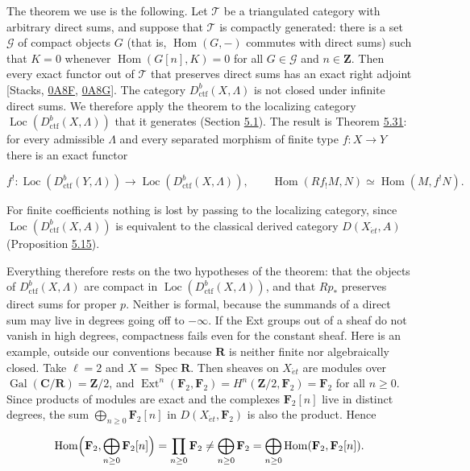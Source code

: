 \documentclass[11pt]{article}
\providecommand{\Ext}{}\renewcommand{\Ext}{\operatorname{Ext}}
\providecommand{\Hom}{}\renewcommand{\Hom}{\operatorname{Hom}}
\providecommand{\Loc}{}\renewcommand{\Loc}{\operatorname{Loc}}
\begin{document}
The theorem we use is the following. Let \(\mathcal T\) be a triangulated category with arbitrary direct sums, and suppose that \(\mathcal T\) is compactly generated: there is a set \(\mathcal G\) of compact objects \(G\) (that is, \(\Hom(G,-)\) commutes with direct sums) such that \(K=0\) whenever \(\Hom(G[n],K)=0\) for all \(G\in\mathcal G\) and \(n\in\mathbf Z\). Then every exact functor out of \(\mathcal T\) that preserves direct sums has an exact right adjoint [Stacks, \href{https://stacks.math.columbia.edu/tag/0A8F}{0A8F}, \href{https://stacks.math.columbia.edu/tag/0A8G}{0A8G}]. The category \(D^b_{\mathrm{ctf}}(X,\Lambda)\) is not closed under infinite direct sums. We therefore apply the theorem to the localizing category \(\Loc(D^b_{\mathrm{ctf}}(X,\Lambda))\) that it generates (Section \hyperref[bp409]{5.1}). The result is Theorem \hyperref[bp506]{5.31}: for every admissible \(\Lambda\) and every separated morphism of finite type \(f:X\to Y\) there is an exact functor

\[
f^!:\Loc(D^b_{\mathrm{ctf}}(Y,\Lambda))\to\Loc(D^b_{\mathrm{ctf}}(X,\Lambda)),
\qquad
\Hom(Rf_!M,N)\simeq\Hom(M,f^!N).
\]

For finite coefficients nothing is lost by passing to the localizing category, since \(\Loc(D^b_{\mathrm{ctf}}(X,A))\) is equivalent to the classical derived category \(D(X_{\acute{e}t},A)\) (Proposition \hyperref[bp454]{5.15}).

Everything therefore rests on the two hypotheses of the theorem: that the objects of \(D^b_{\mathrm{ctf}}(X,\Lambda)\) are compact in \(\Loc(D^b_{\mathrm{ctf}}(X,\Lambda))\), and that \(Rp_*\) preserves direct sums for proper \(p\). Neither is formal, because the summands of a direct sum may live in degrees going off to \(-\infty\). If the Ext groups out of a sheaf do not vanish in high degrees, compactness fails even for the constant sheaf. Here is an example, outside our conventions because \(\mathbf R\) is neither finite nor algebraically closed. Take \(\ell=2\) and \(X=\operatorname{Spec}\mathbf R\). Then sheaves on \(X_{\acute{e}t}\) are modules over \(\operatorname{Gal}(\mathbf C/\mathbf R)=\mathbf Z/2\), and \(\Ext^n(\mathbf F_2,\mathbf F_2)=H^n(\mathbf Z/2,\mathbf F_2)=\mathbf F_2\) for all \(n\geq0\). Since products of modules are exact and the complexes \(\mathbf F_2[n]\) live in distinct degrees, the sum \(\bigoplus_{n\geq0}\mathbf F_2[n]\) in \(D(X_{\acute{e}t},\mathbf F_2)\) is also the product. Hence

\[
\Hom\Bigl(\mathbf F_2,\bigoplus_{n\ge0}\mathbf F_2[n]\Bigr)
=\prod_{n\ge0}\mathbf F_2
\ne\bigoplus_{n\ge0}\mathbf F_2
=\bigoplus_{n\ge0}\Hom(\mathbf F_2,\mathbf F_2[n]).
\]
\end{document}

